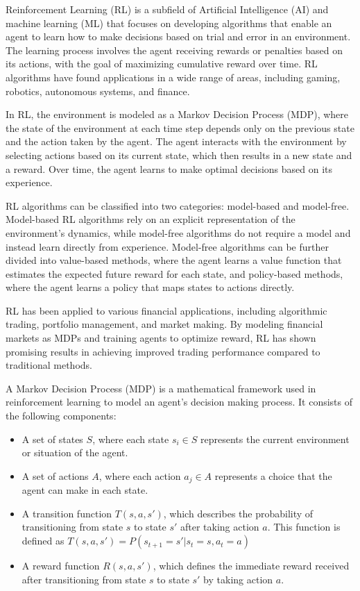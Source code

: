 \documentclass[
  12pt,
  a4paper,
  DIV=11,
  numbers=noendperiod]{scrartcl}
\providecommand{\tightlist}{%
  \setlength{\itemsep}{0pt}\setlength{\parskip}{0pt}}\usepackage{longtable,booktabs,array}
\begin{document}
Reinforcement Learning (RL) is a subfield of Artificial Intelligence
(AI) and machine learning (ML) that focuses on developing algorithms
that enable an agent to learn how to make decisions based on trial and
error in an environment. The learning process involves the agent
receiving rewards or penalties based on its actions, with the goal of
maximizing cumulative reward over time. RL algorithms have found
applications in a wide range of areas, including gaming, robotics,
autonomous systems, and finance.

In RL, the environment is modeled as a Markov Decision Process (MDP),
where the state of the environment at each time step depends only on the
previous state and the action taken by the agent. The agent interacts
with the environment by selecting actions based on its current state,
which then results in a new state and a reward. Over time, the agent
learns to make optimal decisions based on its experience.

RL algorithms can be classified into two categories: model-based and
model-free. Model-based RL algorithms rely on an explicit representation
of the environment's dynamics, while model-free algorithms do not
require a model and instead learn directly from experience. Model-free
algorithms can be further divided into value-based methods, where the
agent learns a value function that estimates the expected future reward
for each state, and policy-based methods, where the agent learns a
policy that maps states to actions directly.

RL has been applied to various financial applications, including
algorithmic trading, portfolio management, and market making. By
modeling financial markets as MDPs and training agents to optimize
reward, RL has shown promising results in achieving improved trading
performance compared to traditional methods.

A Markov Decision Process (MDP) is a mathematical framework used in
reinforcement learning to model an agent's decision making process. It
consists of the following components:

\begin{itemize}
\tightlist
\item
  A set of states \(S\), where each state \(s_i \in S\) represents the
  current environment or situation of the agent.
\item
  A set of actions \(A\), where each action \(a_j \in A\) represents a
  choice that the agent can make in each state.
\item
  A transition function \(T(s, a, s')\), which describes the probability
  of transitioning from state \(s\) to state \(s'\) after taking action
  \(a\). This function is defined as
  \(T(s, a, s') = P(s_{t+1} = s' | s_t = s, a_t = a)\)
\item
  A reward function \(R(s, a, s')\), which defines the immediate reward
  received after transitioning from state \(s\) to state \(s'\) by
  taking action \(a\).
\end{itemize}
\end{document}
